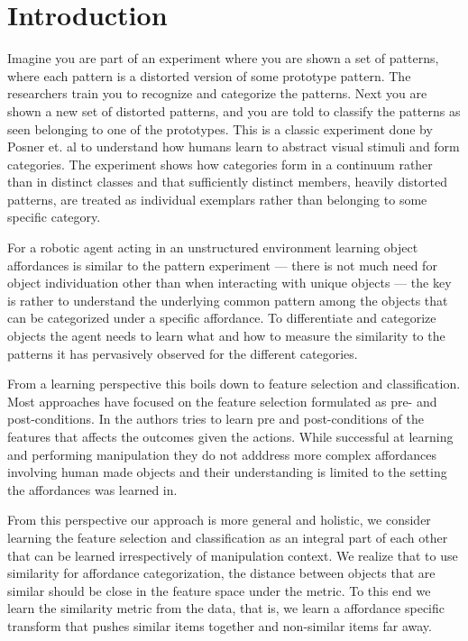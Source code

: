 \section{Introduction}\label{introduction}

Imagine you are part of an experiment where you are shown a set of
patterns, where each pattern is a distorted version of some prototype
pattern. The researchers train you to recognize and categorize the
patterns. Next you are shown a new set of distorted patterns, and you
are told to classify the patterns as seen belonging to one of the
prototypes. This is a classic experiment done by Posner et. al
\cite{POSNER:1967ef} to understand how humans learn to abstract visual
stimuli and form categories. The experiment shows how categories form in
a continuum rather than in distinct classes and that sufficiently
distinct members, heavily distorted patterns, are treated as individual
exemplars rather than belonging to some specific category.

For a robotic agent acting in an unstructured environment learning
object affordances is similar to the pattern experiment --- there is not
much need for object individuation other than when interacting with
unique objects --- the key is rather to understand the underlying common
pattern among the objects that can be categorized under a specific
affordance. To differentiate and categorize objects the agent needs to
learn what and how to measure the similarity to the patterns it has
pervasively observed for the different categories.

From a learning perspective this boils down to feature selection and
classification. Most approaches have focused on the feature selection
formulated as pre- and post-conditions. In
\cite{Stoytchev:2005il, Chao:2011id, Niekum:us} the authors tries to
learn pre and post-conditions of the features that affects the outcomes
given the actions. While successful at learning and performing
manipulation they do not adddress more complex affordances involving
human made objects and their understanding is limited to the setting the
affordances was learned in.

From this perspective our approach is more general and holistic, we
consider learning the feature selection and classification as an
integral part of each other that can be learned irrespectively of
manipulation context. We realize that to use similarity for affordance
categorization, the distance between objects that are similar should be
close in the feature space under the metric. To this end we learn the
similarity metric from the data, that is, we learn a affordance specific
transform that pushes similar items together and non-similar items far
away.

